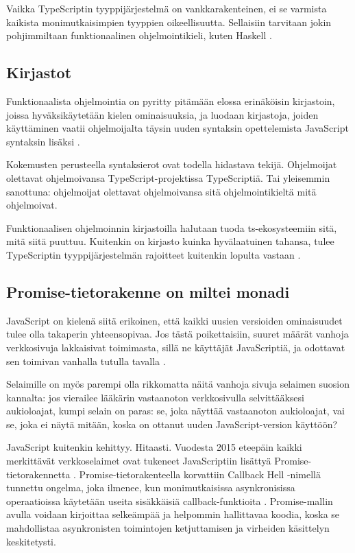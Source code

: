 Vaikka TypeScriptin tyyppijärjestelmä on vankkarakenteinen, ei se varmista kaikista monimutkaisimpien tyyppien oikeellisuutta. Sellaisiin tarvitaan jokin pohjimmiltaan funktionaalinen ohjelmointikieli, kuten Haskell \cite{holvikari2021category}.

\subsection{Kirjastot}

Funktionaalista ohjelmointia on pyritty pitämään elossa erinäköisin kirjastoin, joissa hyväksikäytetään kielen ominaisuuksia, ja luodaan kirjastoja, joiden käyttäminen vaatii ohjelmoijalta täysin uuden syntaksin opettelemista JavaScript syntaksin lisäksi \cite{ramda,sanctuary,crocks,fpts}.

Kokemusten perusteella syntaksierot ovat todella hidastava tekijä. Ohjelmoijat olettavat ohjelmoivansa TypeScript-projektissa TypeScriptiä. Tai yleisemmin sanottuna: ohjelmoijat olettavat ohjelmoivansa sitä ohjelmointikieltä mitä ohjelmoivat.

Funktionaalisen ohjelmoinnin kirjastoilla halutaan tuoda \gls{ts}-ekosysteemiin sitä, mitä siitä puuttuu. Kuitenkin on kirjasto kuinka hyvälaatuinen tahansa, tulee TypeScriptin tyyppijärjestelmän rajoitteet kuitenkin lopulta vastaan \cite{holvikari2021category}.



\subsection{Promise-tietorakenne on miltei monadi}

JavaScript on kielenä siitä erikoinen, että kaikki uusien versioiden ominaisuudet tulee olla takaperin yhteensopivaa. Jos tästä poikettaisiin, suuret määrät vanhoja verkkosivuja lakkaisivat toimimasta, sillä ne käyttäjät JavaScriptiä, ja odottavat sen toimivan vanhalla tutulla tavalla \cite{prototype_library_trends}.

Selaimille on myös parempi olla rikkomatta näitä vanhoja sivuja selaimen suosion kannalta: jos vierailee lääkärin vastaanoton verkkosivulla selvittääksesi aukioloajat, kumpi selain on paras: se, joka näyttää vastaanoton aukioloajat, vai se, joka ei näytä mitään, koska on ottanut uuden JavaScript-version käyttöön? \citep{against_self_closing_tags,proposal-joint-iteration}

JavaScript kuitenkin kehittyy. Hitaasti. Vuodesta 2015 eteepäin kaikki merkittävät verkkoselaimet ovat tukeneet JavaScriptiin lisättyä Promise-tietorakennetta \cite{mdn_promise}. Promise-tietorakenteella korvattiin Callback Hell -nimellä tunnettu ongelma, joka ilmenee, kun monimutkaisissa asynkronisissa operaatioissa käytetään useita sisäkkäisiä callback-funktioita \cite{callbackhell}. Promise-mallin avulla voidaan kirjoittaa selkeämpää ja helpommin hallittavaa koodia, koska se mahdollistaa asynkronisten toimintojen ketjuttamisen ja virheiden käsittelyn keskitetysti.


